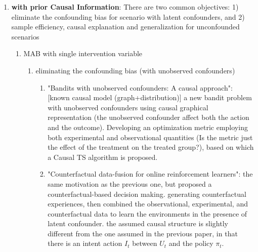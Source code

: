 \begin{enumerate}
    \item \textbf{with prior Causal Information}: There are two common objectives: 1) eliminate the confounding bias for scenario with latent confounders, and 2) sample efficiency, causal explanation and generalization for unconfounded scenarios

    \begin{enumerate}
    \item MAB with single intervention variable
        \begin{enumerate}
            \item eliminating the confounding bias (with unobserved confounders)
            \begin{enumerate}
                \item "Bandits with unobserved confounders: A causal approach": [known causal model (graph+distribution)] a new bandit problem with unobserved confounders using causal graphical representation (the unobserved confounder affect both the action and the outcome). Developing an optimization metric employing both experimental and observational quantities (Is the metric just the effect of the treatment on the treated group?), based on which a Causal TS algorithm is proposed.
                \item "Counterfactual data-fusion for online reinforcement learners": the same motivation as the previous one, but proposed a counterfactual-based decision making. generating counterfactual experiences, then combined the observational, experimental, and counterfactual data to learn the environments in the presence of latent confounder. the assumed causal structure is slightly different from the one assumed in the previous paper, in that there is an intent action $I_t$ between $U_t$ and the policy $\pi_t$.
            \end{enumerate}


\end{enumerate}
\end{enumerate}
\end{enumerate}
